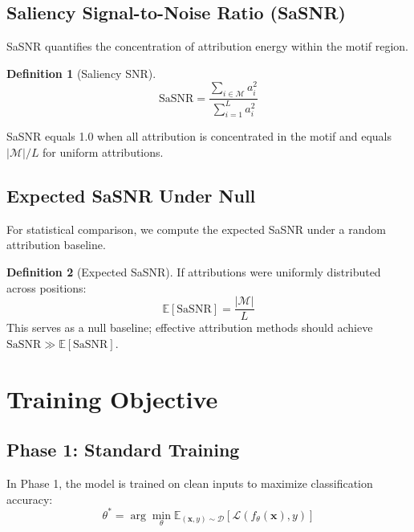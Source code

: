 \documentclass[11pt]{article}
\newcommand{\x}{\mathbf{x}}
\newcommand{\loss}{\mathcal{L}}
\newcommand{\model}{f_\theta}
\newcommand{\E}{\mathbb{E}}
\theoremstyle{definition}
\newtheorem{definition}{Definition}
\begin{document}
\subsection{Saliency Signal-to-Noise Ratio (SaSNR)}

SaSNR quantifies the concentration of attribution energy within the motif region.

\begin{definition}[Saliency SNR]
\begin{equation}
    \text{SaSNR} = \frac{\sum_{i \in \mathcal{M}} a_i^2}{\sum_{i=1}^{L} a_i^2}
\end{equation}
\end{definition}

SaSNR equals 1.0 when all attribution is concentrated in the motif and equals $|\mathcal{M}|/L$ for uniform attributions.

\subsection{Expected SaSNR Under Null}

For statistical comparison, we compute the expected SaSNR under a random attribution baseline.

\begin{definition}[Expected SaSNR]
If attributions were uniformly distributed across positions:
\begin{equation}
    \E[\text{SaSNR}] = \frac{|\mathcal{M}|}{L}
\end{equation}
This serves as a null baseline; effective attribution methods should achieve $\text{SaSNR} \gg \E[\text{SaSNR}]$.
\end{definition}

\section{Training Objective}

\subsection{Phase 1: Standard Training}

In Phase 1, the model is trained on clean inputs to maximize classification accuracy:
\begin{equation}
    \theta^* = \arg\min_\theta \E_{(\x,y) \sim \mathcal{D}} \left[ \loss(\model(\x), y) \right]
\end{equation}
\end{document}
